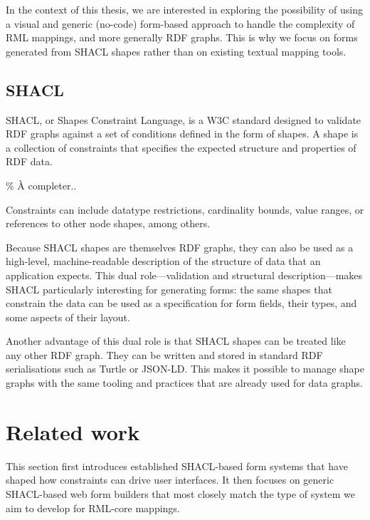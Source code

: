 In the context of this thesis, we are interested in exploring the possibility of using a visual and generic (no-code) form-based approach to handle the complexity of RML mappings, and more generally RDF graphs. This is why we focus on forms generated from SHACL shapes rather than on existing textual mapping tools.


\subsection{SHACL}
\label{sec:background-shacl}

SHACL, or Shapes Constraint Language, is a W3C standard designed to validate RDF graphs against a set of conditions defined in the form of shapes. A shape is a collection of constraints that specifies the expected structure and properties of RDF data. 

\% À completer..

Constraints can include datatype restrictions, cardinality bounds, value ranges, or references to other node shapes, among others.

Because SHACL shapes are themselves RDF graphs, they can also be used as a high-level, machine-readable description of the structure of data that an application expects. This dual role—validation and structural description—makes SHACL particularly interesting for generating forms: the same shapes that constrain the data can be used as a specification for form fields, their types, and some aspects of their layout.

Another advantage of this dual role is that SHACL shapes can be treated like any other RDF graph. They can be written and stored in standard RDF serialisations such as Turtle or JSON-LD. This makes it possible to manage shape graphs with the same tooling and practices that are already used for data graphs.



\section{Related work}

This section first introduces established SHACL-based form systems that have shaped how constraints can drive user interfaces. It then focuses on generic SHACL-based web form builders that most closely match the type of system we aim to develop for RML-core mappings.

